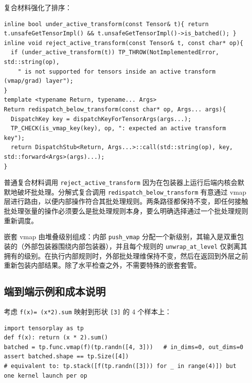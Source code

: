 复合材料强化了排序：

\begin{lstlisting}[caption={composites reject active transforms.}, label=lst:composites]
inline bool under_active_transform(const Tensor& t){ return t.unsafeGetTensorImpl() && t.unsafeGetTensorImpl()->is_batched(); }
inline void reject_active_transform(const Tensor& t, const char* op){
  if (under_active_transform(t)) TP_THROW(NotImplementedError, std::string(op),
    " is not supported for tensors inside an active transform (vmap/grad) layer");
}
template <typename Return, typename... Args>
Return redispatch_below_transform(const char* op, Args... args){
  DispatchKey key = dispatchKeyForTensorArgs(args...);
  TP_CHECK(is_vmap_key(key), op, ": expected an active transform key");
  return DispatchStub<Return, Args...>::call(std::string(op), key, std::forward<Args>(args)...);
}
\end{lstlisting}

普通复合材料调用 \texttt{reject\_active\_transform} 因为在包装器上运行后端内核会默默地破坏批处理。分解式复合调用 \texttt{redispatch\_below\_transform} 有意通过 vmap 层进行路由，以便内部操作符合其批处理规则。两条路径都保持不变，即任何接触批处理张量的操作必须要么是批处理规则本身，要么明确选择通过一个批处理规则重新调度。

嵌套 vmap 由堆叠级别组成：内部 \texttt{push\_vmap} 分配一个新级别，其输入是双重包装的（外部包装器围绕内部包装器），并且每个规则的 \texttt{unwrap\_at\_level} 仅剥离其拥有的级别。在执行内部规则时，外部批处理维保持不变，然后在返回到外层之前重新包装内部结果。除了水平检查之外，不需要特殊的嵌套套管。

\subsection{端到端示例和成本说明}
\label{sec:vmapcost}

考虑 \texttt{f(x)= (x*2).sum} 映射到形状 \texttt{[3]} 的 4 个样本上：

\begin{lstlisting}[caption={Vmap example: one function, batched execution.}, label=lst:vmapexample, style=pystyle]
import tensorplay as tp
def f(x): return (x * 2).sum()
batched = tp.func.vmap(f)(tp.randn([4, 3]))   # in_dims=0, out_dims=0
assert batched.shape == tp.Size([4])
# equivalent to: tp.stack([f(tp.randn([3])) for _ in range(4)]) but one kernel launch per op
\end{lstlisting}


